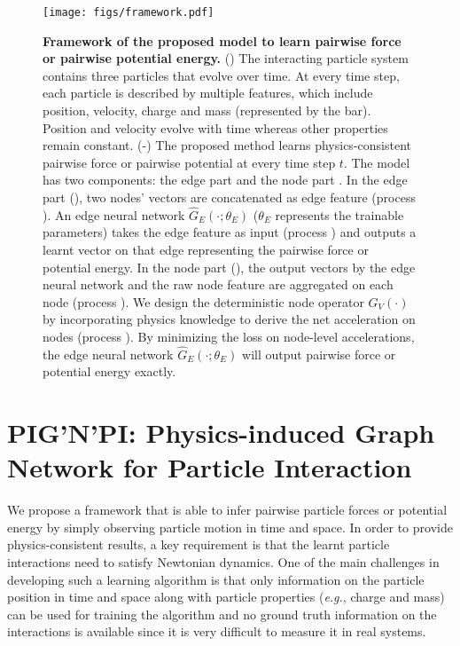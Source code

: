\documentclass{article}
\newcommand*\encircle[1]{\raisebox{.5pt}{\textcircled{\raisebox{-.9pt} {#1}}}}
\begin{document}
\begin{figure*}[t!]
    \centering
    \texttt{[image: figs/framework.pdf]}
    \caption{\textbf{Framework of the proposed model to learn pairwise force or pairwise potential energy. } (\encircle{A}) The  interacting particle system contains three particles that evolve over time. At every time step, each particle is described by multiple features, which include position, velocity, charge and mass (represented by the bar). Position and velocity evolve with time whereas other properties remain constant. (\encircle{B}-\encircle{C}) The proposed method learns physics-consistent pairwise force or pairwise potential at every time step $t$. The model has two components: the edge part \encircle{B} and the node part \encircle{C}. In the edge part (\encircle{B}), two nodes' vectors are concatenated as edge feature (process ). An edge neural network $\hat{G}_E(\cdot; \theta_{E})$ ($\theta_{E}$ represents the trainable parameters) takes the edge feature as input (process ) and outputs a learnt vector on that edge representing the pairwise force or potential energy. In the node part (\encircle{C}), the output vectors by the edge neural network and the raw node feature are aggregated on each node (process ). We design the deterministic node operator $G_V(\cdot)$ by incorporating physics knowledge to derive the net acceleration on nodes (process ). By minimizing the loss on node-level accelerations, the edge neural network $\hat{G}_E(\cdot; \theta_{E})$ will output pairwise force or potential energy exactly.}
    \label{fig:framework}
\end{figure*}

\section{PIG'N'PI: Physics-induced Graph Network for Particle Interaction}
\label{sec:architecture}

We propose a framework that is able to infer pairwise  particle forces or potential energy by simply observing particle motion in time and space. In order to provide physics-consistent results, a key requirement is that  the learnt particle interactions need to satisfy Newtonian dynamics. One of the main challenges in developing such a learning algorithm is that only information on the particle position in time and space along with particle properties (\textit{e.g.}, charge and mass) can be used for training the algorithm and no ground truth information on the interactions is available since it is very difficult to measure it in real systems. 
\end{document}
